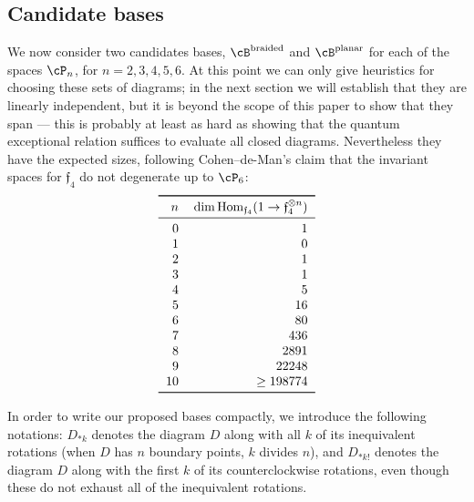 \documentclass[12pt]{amsart}
\begin{document}
\subsection{Candidate bases}
\label{sec:bases}
We now consider two candidates bases, $\cB^{\text{braided}}$ and $\cB^{\text
{planar}}$ for each of the spaces $\cP_n$, for $n = 2,3,4,5,6$.
At this point we can only give heuristics for choosing these sets of diagrams;
in the next section we will establish that they are linearly independent, but
it is beyond the scope of this paper to show that they span --- this is
probably at least as hard as showing that the quantum exceptional relation
suffices to evaluate all closed diagrams. Nevertheless they have the expected
sizes, following Cohen--de-Man's claim that the invariant spaces for
$\mathfrak{f}_4$ do not degenerate up to $\cP_6$:
\[
\begin{tabular}{rr}
  \toprule
  $n$ & $\dim \Hom_{\mathfrak{f}_4} (1 \to \mathfrak{f}_4^{\otimes n})$ \\
  \midrule
  0 & 1 \\ 1 & 0 \\ 2 & 1 \\ 3 & 1 \\ 4 & 5 \\ 5 & 16 \\
  6 & 80 \\ 7 & 436 \\ 8 & 2891 \\ 9 & 22248 \\ 10 & $\ge 198774$ \\
  \bottomrule
\end{tabular}
\]


\newcommand{\diagram}[2]{\mathfig{#1}{graphs/urn_sha1_#2.pdf}}

In order to write our proposed bases compactly, we introduce the following
notations: $D_{*k}$ denotes the diagram $D$ along with all $k$ of its
inequivalent rotations (when $D$ has $n$ boundary points, $k$ divides $n$),
and $D_{*k!}$ denotes the diagram $D$ along with the first $k$ of its
counterclockwise rotations, even though these do not exhaust all of the
inequivalent rotations.
\end{document}
